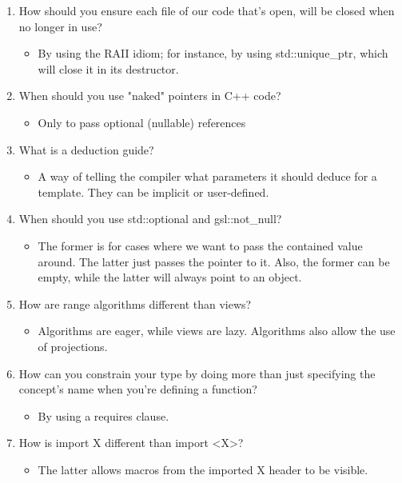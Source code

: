 \begin{enumerate}
\item
How should you ensure each file of our code that's open, will be closed when no longer in use?
\begin{itemize}
\item 
By using the RAII idiom; for instance, by using std::unique\_ptr, which will close it in its destructor.
\end{itemize}

\item When should you use "naked" pointers in C++ code?
\begin{itemize}
\item 
Only to pass optional (nullable) references
\end{itemize}

\item What is a deduction guide?
\begin{itemize}
\item 
A way of telling the compiler what parameters it should deduce for a template. They can be implicit or user-defined.
\end{itemize}

\item When should you use std::optional and gsl::not\_null?
\begin{itemize}
\item 
The former is for cases where we want to pass the contained value around. The latter just passes the pointer to it. Also, the former can be empty, while the latter will always point to an object.
\end{itemize}

\item How are range algorithms different than views?
\begin{itemize}
\item 
Algorithms are eager, while views are lazy. Algorithms also allow the use of projections.
\end{itemize}

\item How can you constrain your type by doing more than just specifying the concept's name when you're defining a function?
\begin{itemize}
\item 
By using a requires clause.
\end{itemize}

\item How is import X different than import <X>?
\begin{itemize}
\item 
The latter allows macros from the imported X header to be visible.
\end{itemize}
\end{enumerate}